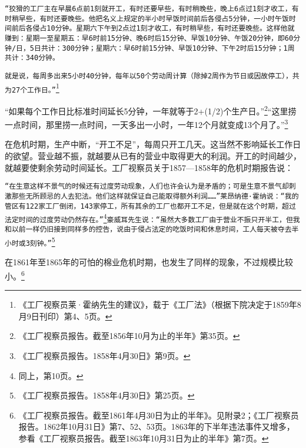 \documentclass{ctexbook}
\begin{document}
    \texttt{“狡猾的工厂主在早晨6点前1刻就开工，有时还要早些，有时稍晚些，晚上6点过1刻才收工，有时稍早些，有时还要晚些。他把名义上规定的半小时早饭时间前后各侵占5分钟，一小时午饭时间前后各侵占10分钟。星期六下午到2点过1刻才收工，有时稍早些，有时还要晚些。这样他就赚到：星期一至星期五：早6时前15分钟、晚6时后15分钟、早饭10分钟、午饭20分钟，即60分钟/日，5日共计：300分钟；星期六：早6时前15分钟、早饭10分钟、下午2时后15分钟；1周共计：340分钟。}

    \texttt{就是说，每周多出来5小时40分钟，每年以50个劳动周计算（除掉2周作为节日或因故停工），共为27个工作日。”}\footnote{《工厂视察员莱·霍纳先生的建议》，载于《工厂法》（根据下院决定于1859年8月9日刊印）第4、5页。}

    “如果每个工作日比标准时间延长5分钟，一年就等于2+(1/2)个生产日。”\footnote{《工厂视察员报告。截至1856年10月为止的半年》第35页。}“这里捞一点时间，那里捞一点时间，一天多出一小时，一年12个月就变成13个月了。”\footnote{《工厂视察员报告。1858年4月30日》第9页。}

    在危机时期，生产中断，“开工不足”，每周只开工几天。这当然不影响延长工作日的欲望。营业越不振，就越要从已有的营业中取得更大的利润。开工的时间越少，就越要使剩余劳动时间延长。工厂视察员关于1857—1858年的危机时期报告说：

    \texttt{“在生意这样不景气的时候还有过度劳动现象，人们也许会认为是矛盾的；可是生意不景气却刺激那些无所顾忌的人去犯法。他们这样就保证自己能取得额外利润……”莱昂纳德·霍纳说：“我的管区有122家工厂倒闭，143家停工，所有其余的工厂也都开工不足，但是就在这个时期，超过法定时间的过度劳动仍然存在。”}\footnote{同上，第10页。}\texttt{豪威耳先生说：“虽然大多数工厂由于营业不振只开半工，但我和以前一样仍旧接到同样多的控告，说由于侵占法定的吃饭时间和休息时间，工人每天被夺去半小时或3刻钟。”}\footnote{《工厂视察员报告。1858年4月30日》第25页。}

    在1861年至1865年的可怕的棉业危机时期，也发生了同样的现象，不过规模比较小。\footnote{《工厂视察员报告。截至1861年4月30日为止的半年》。见附录2；《工厂视察员报告。1862年10月31日》第7、52、53页。1863年的下半年违法事件又增多，参看《工厂视察员报告。截至1863年10月31日为止的半年》第7页。}
\end{document}
